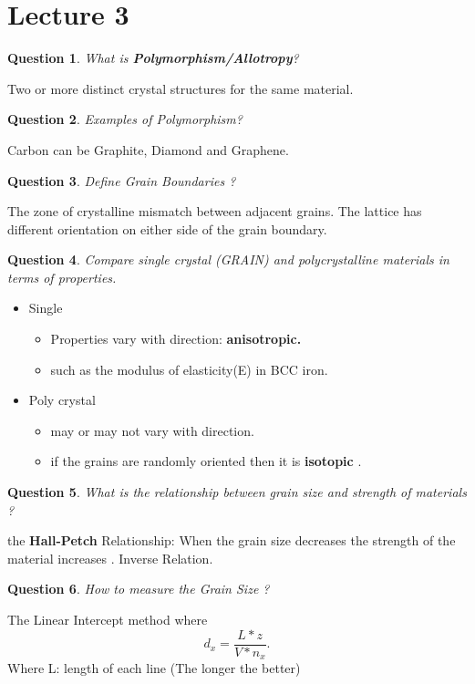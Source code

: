 \documentclass[13]{article}
\newtheorem{exer}{Question}
\begin{document}
\section{Lecture 3}
\begin{exer}
What is \textbf{Polymorphism/Allotropy}? 
\end{exer}
Two or more distinct crystal structures for the same material. 
\begin{exer}
Examples of Polymorphism?
\end{exer}
Carbon can be Graphite, Diamond and Graphene.
\begin{exer}
Define Grain Boundaries ?
\end{exer}
The zone of crystalline mismatch between adjacent grains. The lattice has different orientation on either side of the grain boundary. 
\begin{exer}
	Compare single crystal (GRAIN) and polycrystalline materials in terms of properties.
\end{exer}
\begin{itemize}

\item Single 
	\begin{itemize}
	
	\item Properties vary with direction:\textbf{ anisotropic.
		} 
	\item such as the modulus of elasticity(E) in BCC iron.
	\end{itemize}
\item Poly crystal
\begin{itemize}

\item may or may not vary with direction.
\item if the grains are randomly oriented then it is \textbf{isotopic} .

\end{itemize}
\end{itemize}
\begin{exer}
What is the relationship between grain size and strength of materials ?
\end{exer}
the \textbf{Hall-Petch}  Relationship: When the grain size decreases the strength of the material increases . Inverse Relation.
\begin{exer}
How to measure the Grain Size ?
\end{exer}
The Linear Intercept method where \[
d_x = \frac{L*z}{V*n_x} 
.\]
Where L: length of each line (The longer the better) \\
\end{document}
